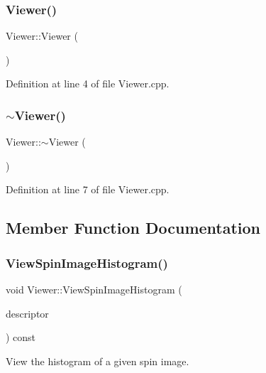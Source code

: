 \subsubsection{\texorpdfstring{Viewer()}{Viewer()}}
{\footnotesize\ttfamily Viewer\+::\+Viewer (\begin{DoxyParamCaption}{ }\end{DoxyParamCaption})}



Definition at line 4 of file Viewer.\+cpp.

\mbox{\label{class_viewer_a324e5a6a1532fe5eac3f3b0e4792b2da}} 
\subsubsection{\texorpdfstring{$\sim$\+Viewer()}{~Viewer()}}
{\footnotesize\ttfamily Viewer\+::$\sim$\+Viewer (\begin{DoxyParamCaption}{ }\end{DoxyParamCaption})}



Definition at line 7 of file Viewer.\+cpp.



\subsection{Member Function Documentation}
\mbox{\label{class_viewer_af5b5d29371cad5439cffbc1e242ecfcd}} 
\subsubsection{\texorpdfstring{View\+Spin\+Image\+Histogram()}{ViewSpinImageHistogram()}}
{\footnotesize\ttfamily void Viewer\+::\+View\+Spin\+Image\+Histogram (\begin{DoxyParamCaption}\item[{const \hyperlink{include_8h_ab79ade12a22a8e5e2864650f820e9c6f}{Spin\+Image} \&}]{descriptor }\end{DoxyParamCaption}) const}

View the histogram of a given spin image.


